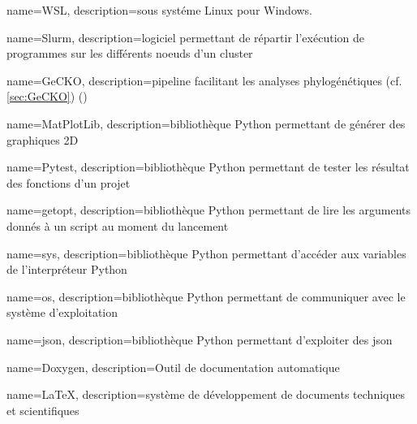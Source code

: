  {
    name=WSL,
    description={sous systéme Linux pour Windows. \cite{wsl}}
}

 {
    name=Slurm,
    description={logiciel permettant de répartir l'exécution de programmes sur les différents noeuds d'un \gls{cluster} \cite{slurm}}
}
\newcommand{\Slurm}{\gls{Slurm}}

 {
    name=GeCKO,
    description={pipeline facilitant les analyses phylogénétiques (cf. \cref{sec:GeCKO}) (\cite{ardisson_gecko_2024})}
}
\newcommand{\GeCKO}{\gls{GeCKO}}


 {
    name=MatPlotLib,
    description={bibliothèque \gls{Python} permettant de générer des graphiques 2D \cite{matplotlib}}
}
\newcommand{\MatPlotLib}{\gls{MatPlotLib}}

 {
    name=Pytest,
    description={bibliothèque \gls{Python} permettant de tester les résultat des fonctions d'un projet \cite{pytest}}
}
\newcommand{\Pytest}{\gls{Pytest}}
\newcommand{\pytest}{\gls{Pytest}}


\newcommand{\bashrc}{"\gls{bashrc}"}



 {
    name=getopt,
    description={bibliothèque \gls{Python} permettant de lire les arguments donnés à un script au moment du lancement \cite{getopt}}
}
\newcommand{\getopts}{\gls{getopts}}

 {
    name=sys,
    description={bibliothèque \gls{Python} permettant d'accéder aux variables de l'interpréteur \gls{Python} \cite{sys}}
}

 {
    name=os,
    description={bibliothèque \gls{Python} permettant de communiquer avec le système d'exploitation \cite{os}}
}

 {
    name=json,
    description={bibliothèque \gls{Python} permettant d'exploiter des \gls{json} \cite{json}}
}





 {
    name=Doxygen,
    description={Outil de documentation automatique \cite{doxygen}}
}
\newcommand{\Doxygen}{\gls{Doxygen}}

 {
    name=\LaTeX,
    description={système de développement de documents techniques et scientifiques \cite{latex}}
}
\newcommand{\Latex}{\gls{Latex}}

